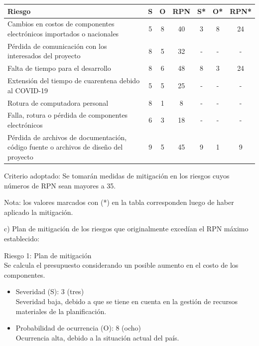 \documentclass[11pt]{charter}
\begin{document}
\begin{table}[htpb]
\centering
\begin{tabularx}{\linewidth}{@{}|X|c|c|c|c|c|c|@{}}
\hline
\rowcolor[HTML]{C0C0C0} 
Riesgo & S & O & RPN & S* & O* & RPN* \\ \hline
Cambios en costos de componentes electrónicos importados o nacionales                  & 5 & 8 & 40 &  3 &  8 & 24   \\ \hline
Pérdida de comunicación con los interesados del proyecto                               & 8 & 5 & 32 &  - &  - & -    \\ \hline
Falta de tiempo para el desarrollo                                                     & 8 & 6 & 48 &  8 &  3 & 24   \\ \hline
Extensión del tiempo de cuarentena debido al COVID-19                                  & 5 & 5 & 25 &  - &  - & -    \\ \hline
Rotura de computadora personal                                                         & 8 & 1 &  8 &  - &  - & -    \\ \hline
Falla, rotura o pérdida de componentes electrónicos                                    & 6 & 3 & 18 &  - &  - & -    \\ \hline
Pérdida de archivos de documentación, código fuente o archivos de diseño del proyecto  & 9 & 5 & 45 &  9 &  1 & 9    \\ \hline
\end{tabularx}%
\end{table}

Criterio adoptado: 
Se tomarán medidas de mitigación en los riesgos cuyos números de RPN sean mayores a 35.

Nota: los valores marcados con (*) en la tabla corresponden luego de haber aplicado la mitigación.

c) Plan de mitigación de los riesgos que originalmente excedían el RPN máximo establecido:

Riesgo 1: Plan de mitigación \\
Se calcula el presupuesto considerando un posible aumento en el costo de los componentes.
\begin{itemize}
\item Severidad (S): 3 (tres) \\
Severidad baja, debido a que se tiene en cuenta en la gestión de recursos materiales de la planificación.
\item Probabilidad de ocurrencia (O): 8 (ocho) \\
Ocurrencia alta, debido a la situación actual del país. 
\end{itemize}
\end{document}
